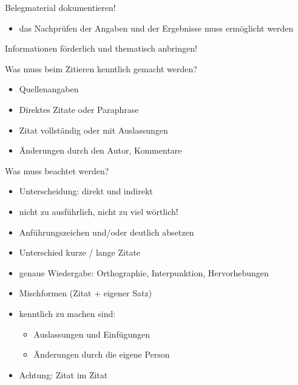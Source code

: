 \documentclass[ 12pt,
                titlepage,
                parskip=half,
                version=first,
                bibliography=totocnumbered,
                final,
                listof=totoc]{scrartcl}
\begin{document}
\begin{description}
    \item[Belegmaterial dokumentieren!]
\end{description}
\begin{itemize}
    \item das Nachprüfen der Angaben und der Ergebnisse muss ermöglicht werden
\end{itemize}

\begin{description}
    \item[Informationen förderlich und thematisch anbringen!]
\end{description}

\begin{description}
    \item[Was muss beim Zitieren kenntlich gemacht werden?]
\end{description}
\begin{itemize}
    \item Quellenangaben
    \item Direktes Zitate oder Paraphrase
    \item Zitat vollständig oder mit Auslassungen
    \item Änderungen durch den Autor, Kommentare
\end{itemize}

\begin{description}
    \item[Was muss beachtet werden?]
\end{description}
\begin{itemize}
    \item Unterscheidung: direkt und indirekt
    \item nicht zu ausführlich, nicht zu viel wörtlich!
    \item Anführungszeichen und/oder deutlich absetzen
    \item Unterschied kurze / lange Zitate
    \item genaue Wiedergabe: Orthographie, Interpunktion, Hervorhebungen
    \item Mischformen (Zitat + eigener Satz)
    \item kenntlich zu machen sind:
\begin{itemize}
    \item Auslassungen und Einfügungen
    \item Änderungen durch die eigene Person
\end{itemize}
    \item Achtung: Zitat im Zitat
\end{itemize}
\end{document}
